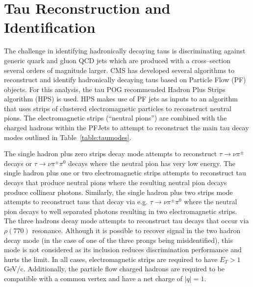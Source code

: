 \chapter{Tau Reconstruction and Identification}

The challenge in identifying hadronically decaying taus is discriminating against generic quark and gluon QCD jets 
which are produced with a cross--section several orders of magnitude larger. CMS has developed several algorithms to 
reconstruct and identify
hadronically decaying taus based on Particle Flow (PF) objects. For this analysis, the tau POG 
recommended Hadron Plus Strips algorithm (HPS) is used. HPS makes use of PF jets as 
inputs to an algorithm that uses strips of clustered electromagnetic particles to reconstruct neutral pions. The 
electromagnetic strips (``neutral pions'') are combined with the charged hadrons within the PFJets to attempt to 
reconstruct the main tau decay modes outlined in Table~\ref{table:taumodes}.

\begin{table}[ht]
  \caption{Reconstructed Tau Decay Modes}
  \label{table:taumodes} %
\end{table}

The single hadron plus zero strips decay mode attempts to reconstruct $\tau \to \nu\pi^{\pm}$ decays or $\tau \to 
\nu\pi^{\pm}\pi^{0}$ decays where the neutral pion has very low energy. The single hadron plus one or two 
electromagnetic strips attempts to reconstruct tau decays that produce neutral pions where the resulting neutral pion 
decays produce collinear photons. Similarly, the single hadron plus two strips mode attempts to reconstruct taus that 
decay via e.g. $\tau \to \nu\pi^{\pm}\pi^{0}$ where the neutral pion decays to well separated photons resulting in two 
electromagnetic strips. The three hadrons decay mode attempts to reconstruct tau decays that occur via 
$\rho(770)$ resonance. Although it is possible to recover signal in the two hadron decay mode (in the case of one of the
three prongs being misidentified), this mode is not considered as its inclusion reduces discrimination performance and 
hurts the limit. 
In all cases, electromagnetic strips are 
required to have $E_{T} > 1$ GeV/c. Additionally,
the particle flow charged hadrons are required to be compatible with a common 
vertex and have a net charge of $|q|=1$.

